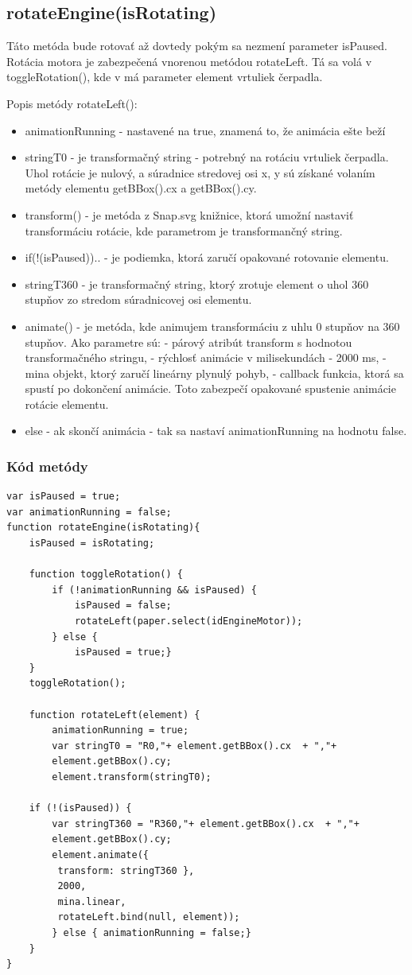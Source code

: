 \subsection{rotateEngine(isRotating)}
Táto metóda bude rotovať až dovtedy pokým sa nezmení parameter isPaused. Rotácia motora je zabezpečená vnorenou metódou rotateLeft. Tá sa volá v toggleRotation(), kde v má parameter element vrtuliek čerpadla. 

Popis metódy rotateLeft():
\begin{itemize}
\item animationRunning - nastavené na true, znamená to, že animácia ešte beží
\item stringT0 - je transformačný string - potrebný na rotáciu vrtuliek čerpadla. Uhol rotácie je nulový, a súradnice stredovej osi x, y sú získané volaním metódy elementu getBBox().cx a getBBox().cy. 
\item transform() - je metóda z Snap.svg knižnice, ktorá umožní nastaviť transformáciu rotácie, kde parametrom je transformančný string. 
\item if(!(isPaused)){..} - je podiemka, ktorá zaručí opakované rotovanie elementu. 
\item stringT360 - je transformačný string, ktorý zrotuje element o uhol 360 stupňov zo stredom súradnicovej osi elementu. 
\item animate() - je metóda, kde animujem transformáciu z uhlu 0 stupňov na 360 stupňov. Ako parametre sú:
\subitem - párový atribút transform s hodnotou transformačného stringu, 
\subitem - rýchlosť animácie v milisekundách - 2000 ms, 
\subitem - mina objekt, ktorý zaručí lineárny plynulý pohyb, 
\subitem - callback funkcia, ktorá sa spustí po dokončení animácie. Toto zabezpečí opakované spustenie animácie rotácie elementu. 
\item else - ak skončí animácia - tak sa nastaví animationRunning na hodnotu false. 
\end{itemize}

\subsubsection{Kód metódy} 
\begin{lstlisting}
var isPaused = true;
var animationRunning = false;
function rotateEngine(isRotating){
	isPaused = isRotating;

	function toggleRotation() {
		if (!animationRunning && isPaused) {
			isPaused = false;
			rotateLeft(paper.select(idEngineMotor));
		} else {
			isPaused = true;}
	}
	toggleRotation();

	function rotateLeft(element) {
		animationRunning = true;
		var stringT0 = "R0,"+ element.getBBox().cx 	+ ","+
		element.getBBox().cy;
		element.transform(stringT0);

	if (!(isPaused)) {
		var stringT360 = "R360,"+ element.getBBox().cx 	+ ","+
		element.getBBox().cy;
		element.animate({
		 transform: stringT360 },
		 2000, 
		 mina.linear, 
		 rotateLeft.bind(null, element));
		} else { animationRunning = false;}
	}
}
\end{lstlisting}









